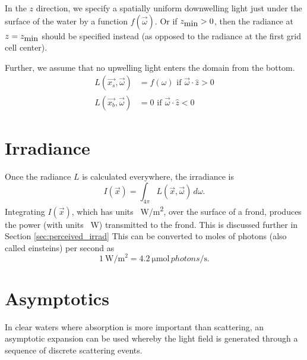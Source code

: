 In the $z$ direction, we specify a spatially uniform downwelling light just
under the surface of the water by a function $f(\vec{\omega})$.
Or if $z_{\mbox{min}}>0$, then the radiance at $z=z_{\mbox{min}}$ should be specified instead (as opposed to the radiance at the first grid cell center).

Further, we assume that no upwelling light enters the domain from the bottom.
\begin{align}
  L(\vec{x_s}, \vec{\omega}) &= f(\omega) \mbox{ if } \vec{\omega} \cdot \hat{z} > 0\\ 
  L(\vec{x_b}, \vec{\omega}) &= 0 \mbox { if } \vec{\omega} \cdot \hat{z} < 0
\end{align}
 
\section{Irradiance}
Once the radiance $L$ is calculated everywhere, the irradiance is
\begin{equation}
  I(\vec{x}) = \int_{4\pi}L(\vec{x},\vec{\omega})\, d\omega.
\end{equation}
Integrating $I(\vec{x})$, which has units \SI{}{\W/m^2}, over the surface of a frond, produces the power (with units \SI{}{\W}) transmitted to the frond.
This is discussed further in Section \ref{sec:perceived_irrad}
This can be converted to moles of photons (also called einsteins) per second as
\begin{equation}
  \SI{1}{\W\per\m^2} = \SI{4.2}{\micro\mole \,photons\per\second}.
\end{equation}

\section{Asymptotics}
In clear waters where absorption is more important than scattering, an asymptotic expansion can be used whereby the light field is generated through a sequence of discrete scattering events.
